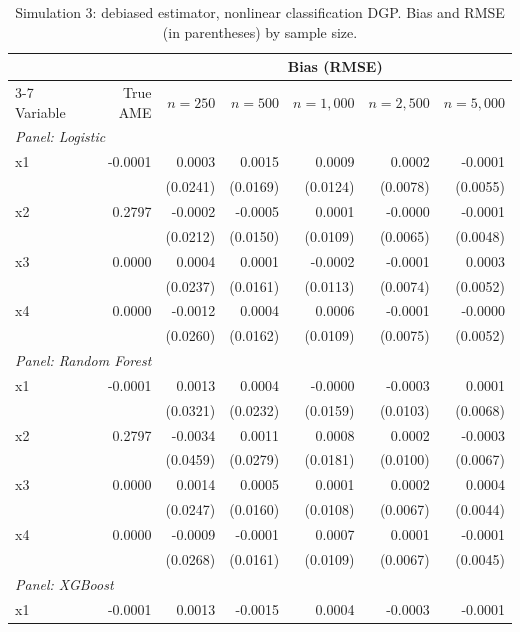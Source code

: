 \begin{table}[htbp]
\centering
\small
\begin{threeparttable}
\caption{Simulation 3: debiased estimator, nonlinear classification DGP. Bias and RMSE (in parentheses) by sample size.}
\label{tab:sim3_bias_classification_nonlinear}
\begin{tabular}{lrrrrrr}
\toprule
 & & \multicolumn{5}{c}{Bias (RMSE)} \\
\cmidrule(lr){3-7}
Variable & True AME & $n=250$ & $n=500$ & $n=1,000$ & $n=2,500$ & $n=5,000$ \\
\midrule
\multicolumn{7}{l}{\textit{Panel: Logistic}} \\
\quad x1 & -0.0001 & 0.0003 & 0.0015 & 0.0009 & 0.0002 & -0.0001 \\
 &  & (0.0241) & (0.0169) & (0.0124) & (0.0078) & (0.0055) \\
\quad x2 & 0.2797 & -0.0002 & -0.0005 & 0.0001 & -0.0000 & -0.0001 \\
 &  & (0.0212) & (0.0150) & (0.0109) & (0.0065) & (0.0048) \\
\quad x3 & 0.0000 & 0.0004 & 0.0001 & -0.0002 & -0.0001 & 0.0003 \\
 &  & (0.0237) & (0.0161) & (0.0113) & (0.0074) & (0.0052) \\
\quad x4 & 0.0000 & -0.0012 & 0.0004 & 0.0006 & -0.0001 & -0.0000 \\
 &  & (0.0260) & (0.0162) & (0.0109) & (0.0075) & (0.0052) \\
\midrule
\multicolumn{7}{l}{\textit{Panel: Random Forest}} \\
\quad x1 & -0.0001 & 0.0013 & 0.0004 & -0.0000 & -0.0003 & 0.0001 \\
 &  & (0.0321) & (0.0232) & (0.0159) & (0.0103) & (0.0068) \\
\quad x2 & 0.2797 & -0.0034 & 0.0011 & 0.0008 & 0.0002 & -0.0003 \\
 &  & (0.0459) & (0.0279) & (0.0181) & (0.0100) & (0.0067) \\
\quad x3 & 0.0000 & 0.0014 & 0.0005 & 0.0001 & 0.0002 & 0.0004 \\
 &  & (0.0247) & (0.0160) & (0.0108) & (0.0067) & (0.0044) \\
\quad x4 & 0.0000 & -0.0009 & -0.0001 & 0.0007 & 0.0001 & -0.0001 \\
 &  & (0.0268) & (0.0161) & (0.0109) & (0.0067) & (0.0045) \\
\midrule
\multicolumn{7}{l}{\textit{Panel: XGBoost}} \\
\quad x1 & -0.0001 & 0.0013 & -0.0015 & 0.0004 & -0.0003 & -0.0001 \\

\end{tabular}
\end{threeparttable}
\end{table}
